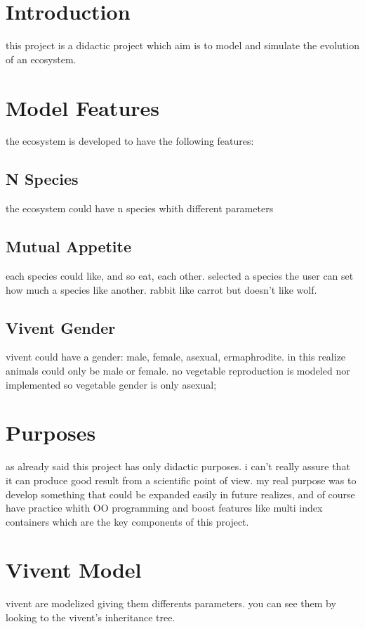 \hypertarget{index_intro}{}\section{Introduction}\label{index_intro}
this project is a didactic project which aim is to model and simulate the evolution of an ecosystem.\hypertarget{index_features}{}\section{Model Features}\label{index_features}
the ecosystem is developed to have the following features:\hypertarget{index_n_species}{}\subsection{N Species}\label{index_n_species}
the ecosystem could have n species whith different parameters\hypertarget{index_mutual_appetite}{}\subsection{Mutual Appetite}\label{index_mutual_appetite}
each species could like, and so eat, each other. selected a species the user can set how much a species like another. rabbit like carrot but doesn't like wolf.\hypertarget{index_gender}{}\subsection{Vivent Gender}\label{index_gender}
vivent could have a gender: male, female, asexual, ermaphrodite. in this realize animals could only be male or female. no vegetable reproduction is modeled nor implemented so vegetable gender is only asexual;\hypertarget{index_purposes}{}\section{Purposes}\label{index_purposes}
as already said this project has only didactic purposes. i can't really assure that it can produce good result from a scientific point of view. my real purpose was to develop something that could be expanded easily in future realizes, and of course have practice whith OO programming and boost features like multi index containers which are the key components of this project.\hypertarget{index_vivent_model}{}\section{Vivent Model}\label{index_vivent_model}
vivent are modelized giving them differents parameters. you can see them by looking to the vivent's inheritance tree. 
